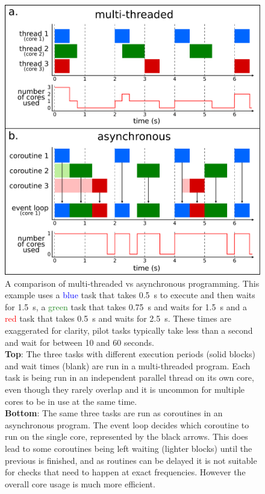 \begin{colsection}
\begin{colsection}
\begin{figure}[p]
\begin{center}
\includegraphics[width=0.9\linewidth]{images/async.pdf}
\end{center}
\caption[Multi-threaded vs asynchronous programming]{A comparison of multi-threaded vs asynchronous programming. This example uses a \textcolor{blue}{blue} task that takes \SI{0.5}{\second} to execute and then waits for \SI{1.5}{\second}, a \textcolor{ForestGreen}{green} task that takes \SI{0.75}{\second} and waits for \SI{1.5}{\second} and a \textcolor{red}{red} task that takes \SI{0.5}{\second} and waits for \SI{2.5}{\second}. These times are exaggerated for clarity, pilot tasks typically take less than a second and wait for between 10 and 60 seconds.
\\
\textbf{Top}: The three tasks with different execution periods (solid blocks) and wait times (blank) are run in a multi-threaded program. Each task is being run in an independent parallel thread on its own core, even though they rarely overlap and it is uncommon for multiple cores to be in use at the same time.
\\
\textbf{Bottom}: The same three tasks are run as coroutines in an asynchronous program. The event loop decides which coroutine to run on the single core, represented by the black arrows. This does lead to some coroutines being left waiting (lighter blocks) until the previous is finished, and as routines can be delayed it is not suitable for checks that need to happen at exact frequencies. However the overall core usage is much more efficient.}
\label{fig:async}
\end{figure}


\end{colsection}
\end{colsection}
